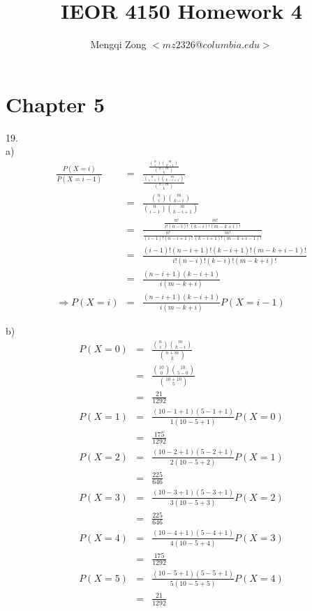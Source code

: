 \documentclass[12pt]{article}
\title{IEOR 4150 Homework 4}
\author{Mengqi Zong $<mz2326@columbia.edu>$}
\begin{document}
\maketitle

\setlength{\parindent}{0in}

\section*{Chapter 5}

19. \\
a)
\begin{eqnarray*}
  \frac {P(X=i)}{P(X=i-1)}
  &=& \frac
  { \frac {\binom {n}{i} \binom {m}{k-i}} {\binom {n+m}{k}}}
  { \frac {\binom {n}{i-1} \binom {m}{k-i+1}} {\binom {n+m}{k}}} \\
  &=& \frac
  { \binom {n}{i} \binom {m}{k-i}}
  { \binom {n}{i-1} \binom {m}{k-i+1}} \\
  &=& \frac
  { \frac {n!}{i!(n-i)!} \frac {m!}{(k-i)!(m-k+i)!}}
  { \frac {n!}{(i-1)!(n-i+1)!} \frac {m!}{(k-i+1)!(m-k+i-1)!}} \\
  &=& \frac
  {(i-1)!(n-i+1)!(k-i+1)!(m-k+i-1)!}
  {i!(n-i)!(k-i)!(m-k+i)!} \\
  &=& \frac {(n-i+1)(k-i+1)}{i(m-k+i)} \\
  \Rightarrow P(X=i)
  &=& \frac {(n-i+1)(k-i+1)}{i(m-k+i)} P(X=i-1)
\end{eqnarray*}

b)
\begin{eqnarray*}
  P(X = 0)
  &=& \frac {\binom {n}{i} \binom {m}{k-i}}{\binom {n+m}{k}} \\
  &=& \frac {\binom {10}{0} \binom {10}{5-0}}{\binom {10+10}{5}} \\
  &=& \frac {21}{1292} \\
  P(X = 1)
  &=& \frac {(10-1+1)(5-1+1)}{1(10-5+1)} P(X=0) \\
  &=& \frac {175}{1292} \\
  P(X = 2)
  &=& \frac {(10-2+1)(5-2+1)}{2(10-5+2)} P(X=1) \\
  &=& \frac {225}{646} \\
  P(X = 3)
  &=& \frac {(10-3+1)(5-3+1)}{3(10-5+3)} P(X=2) \\
  &=& \frac {225}{646} \\
  P(X = 4)
  &=& \frac {(10-4+1)(5-4+1)}{4(10-5+4)} P(X=3) \\
  &=& \frac {175}{1292} \\
  P(X = 5)
  &=& \frac {(10-5+1)(5-5+1)}{5(10-5+5)} P(X=4) \\
  &=& \frac {21}{1292}
\end{eqnarray*}
\end{document}

